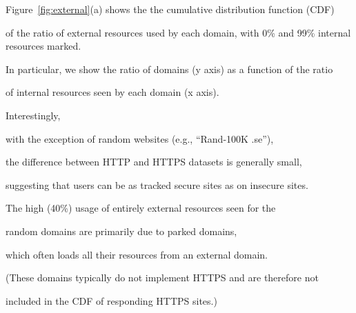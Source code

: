 \documentclass{sig-alternate-10pt}
\begin{document}




Figure~\ref{fig:external}(a) shows the the cumulative distribution function (CDF) 

of the ratio of external resources used by each domain, with 0\% and 99\% internal resources marked. 

In particular, we show the ratio of domains (y axis) as a function of the ratio 

of internal resources seen by each domain (x axis).

Interestingly, 

with the exception of random websites (e.g., ``Rand-100K .se''),

the difference between HTTP and HTTPS datasets is generally small, 

suggesting that users can be as tracked secure sites as on insecure sites.

The high (40\%) usage of entirely external resources seen for the

random domains are primarily due to parked domains,

which often loads all their resources from an external domain.

(These domains typically do not implement HTTPS and are therefore not

included in the CDF of responding HTTPS sites.)







\end{document}
